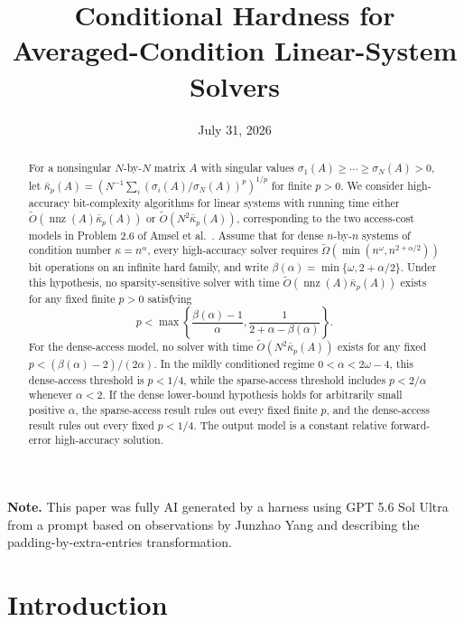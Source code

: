 \documentclass[11pt]{article}
\title{Conditional Hardness for Averaged-Condition Linear-System Solvers}
\author{}
\date{July 31, 2026}
\begin{document}

\maketitle

\begin{abstract}
For a nonsingular $N$-by-$N$ matrix $A$ with singular values
$\sigma_1(A)\geq \cdots \geq \sigma_N(A)>0$, let
$\bar{\kappa}_p(A)=\left(N^{-1}\sum_i(\sigma_i(A)/\sigma_N(A))^p\right)^{1/p}$
for finite $p>0$.  We consider high-accuracy bit-complexity algorithms for
linear systems with running time either
$\widetilde{O}(\operatorname{nnz}(A)\bar{\kappa}_p(A))$ or
$\widetilde{O}(N^2\bar{\kappa}_p(A))$, corresponding to the two access-cost
models in Problem 2.6 of Amsel et al.~\cite{AmselEtAl2026SimonsLinearSystems}.
Assume that for dense $n$-by-$n$
systems of condition number $\kappa=n^{\alpha}$, every high-accuracy solver
requires
$\widetilde{\Omega}(\min(n^{\omega},n^{2+\alpha/2}))$ bit operations on an
infinite hard family, and write
$\beta(\alpha)=\min\{\omega,2+\alpha/2\}$.  Under this hypothesis, no
sparsity-sensitive solver with time
$\widetilde{O}(\operatorname{nnz}(A)\bar{\kappa}_p(A))$ exists for any fixed
finite $p>0$ satisfying
\[
  p<
  \max\left\{
    \frac{\beta(\alpha)-1}{\alpha},
    \frac{1}{2+\alpha-\beta(\alpha)}
  \right\}.
\]
For the dense-access model, no solver with time
$\widetilde{O}(N^2\bar{\kappa}_p(A))$ exists for any fixed
$p<(\beta(\alpha)-2)/(2\alpha)$.  In the mildly conditioned regime
$0<\alpha<2\omega-4$, this dense-access threshold is $p<1/4$, while the
sparse-access threshold includes $p<2/\alpha$ whenever $\alpha<2$.  If the
dense lower-bound hypothesis holds for arbitrarily small positive $\alpha$,
the sparse-access result rules out every fixed finite $p$, and the dense-access
result rules out every fixed $p<1/4$.  The output model is a constant relative
forward-error high-accuracy solution.
\end{abstract}

\noindent\textbf{Note.} This paper was fully AI generated by a harness using GPT 5.6 Sol Ultra from a prompt based on observations by Junzhao Yang and describing the padding-by-extra-entries transformation.

\clearpage
\tableofcontents
\clearpage


\section{Introduction}
\end{document}
